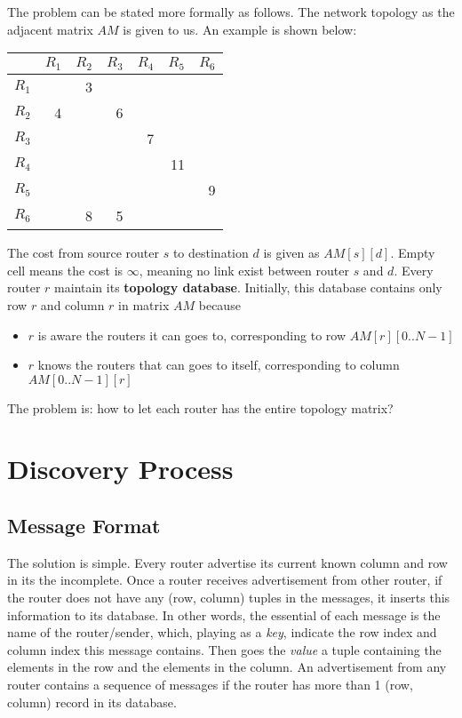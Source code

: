 \documentclass[12pt]{article}  %
\theoremstyle{definition}
\theoremstyle{remark}
\begin{document}
The problem can be stated more formally as follows. The network topology as the adjacent matrix $AM$ is given to us.
An example is shown below:
\begin{center}
\begin{tabular}{|r|r|r|r|r|r|r|}        %
\hline                                  %
 & $R_1$ & $R_2$ & $R_3$ & $R_4$ & $R_5$ & $R_6$ \\ %
\hline
$R_1$ &   & 3 &   &   &    & \\
\hline
$R_2$ & 4 &   & 6 &   &    & \\
\hline
$R_3$ &   &   &   & 7 &    & \\
\hline
$R_4$ &   &   &   &   & 11 & \\
\hline
$R_5$ &   &   &   &   &    & 9 \\
\hline
$R_6$ &   & 8 & 5 &   &    & \\
\hline
\end{tabular}
\end{center}
The cost from source router $s$ to destination $d$ is given as $AM[s][d]$.
Empty cell means the cost is $\infty$, meaning no link exist between router $s$ and $d$.
Every router $r$ maintain its \textbf{topology database}. 
Initially, this database contains only row $r$ and column $r$ in matrix $AM$ because
\begin{itemize}
        \item $r$ is aware the routers it can goes to, corresponding to row $AM[r][0..N-1]$
        \item $r$ knows the routers that can goes to itself, corresponding to column $AM[0..N-1][r]$
\end{itemize}
The problem is: how to let each router has the entire topology matrix?

\section{Discovery Process}

\subsection{Message Format}
The solution is simple.
Every router advertise its current known column and row in its the incomplete.
Once a router receives advertisement from other router, if the router does not have any (row, column) tuples in the messages, it inserts this information to its database.
In other words, the essential of each message is the name of the router/sender, which, playing as a \textit{key}, indicate the row index and column index this message contains.
Then goes the \textit{value} a tuple containing the elements in the row and the elements in the column.
An advertisement from any router contains a sequence of messages if the router has more than 1 (row, column) record in its database.
\end{document}
